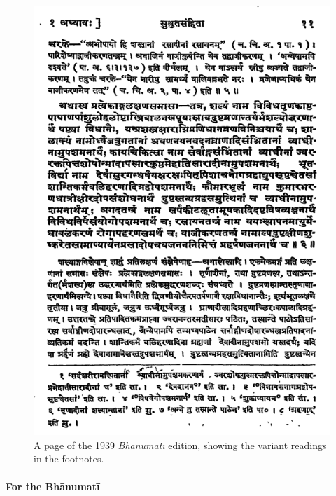 \begin{figure}[p]
    \centering
    \includegraphics[draft=false,height=.9\textheight]{media/Bhanumati-page-11}
    \caption{A page of the 1939 \emph{Bhānumatī} edition, showing the variant 
readings in 
        the 
        footnotes.}
    \label{fig:bhanumati-page-11}
\end{figure}


\paragraph{For the Bhānumatī}

